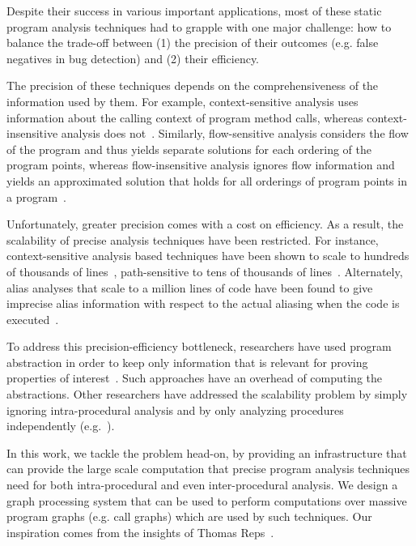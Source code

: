 \documentclass[10pt,preprint]{sigplanconf}
\begin{document}
Despite their success in various important applications, most of these static program analysis techniques had to grapple with one major challenge: how to balance the trade-off between (1) the precision of their outcomes (e.g. false negatives in bug detection) and (2) their efficiency. 

The precision of these techniques depends on the comprehensiveness of the information used by them. For example, context-sensitive analysis uses information about the calling context of program method calls, whereas context-insensitive analysis does not~\cite{Xu}. Similarly, flow-sensitive analysis considers the flow of the program and thus yields separate solutions for each ordering of the program points, whereas flow-insensitive analysis ignores flow information and yields an approximated solution that holds for all orderings of program points in a program~\cite{hardekopf}.

Unfortunately, greater precision comes with a cost on efficiency. As a result, the scalability of precise analysis techniques have been restricted. For instance, context-sensitive analysis based techniques have been shown to scale to hundreds of thousands of lines~\cite{aiken06, liang04}, path-sensitive
to tens of thousands of lines~\cite{aiken06, wilson}. Alternately, alias analyses that scale to a million lines of code have been found to give imprecise alias information with respect to the actual aliasing when the code is executed~\cite{aiken06, liang, mock}. 

To address this precision-efficiency bottleneck, researchers have used program abstraction in order to keep only information that is relevant for proving properties of interest~\cite{zhang}. Such approaches have an overhead of computing the abstractions. Other researchers have addressed the scalability problem by simply ignoring intra-procedural analysis and by only analyzing procedures independently (e.g.~\cite{aiken08}).

In this work, we tackle the problem head-on, by providing an infrastructure that can provide the large scale computation that precise program analysis techniques need for both intra-procedural and even inter-procedural analysis. We design a graph processing system that can be used to perform computations over massive program graphs (e.g. call graphs) which are used by such techniques. Our inspiration comes from the insights of Thomas Reps~\cite{reps}.
\end{document}
